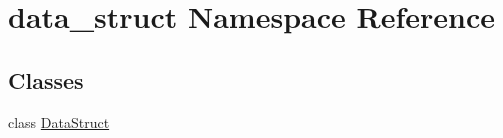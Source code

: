 \hypertarget{namespacedata__struct}{\section{data\-\_\-struct Namespace Reference}
\label{namespacedata__struct}
}
\subsection*{Classes}
\begin{DoxyCompactItemize}
\item 
class \hyperlink{classdata__struct_1_1_data_struct}{Data\-Struct}
\end{DoxyCompactItemize}
